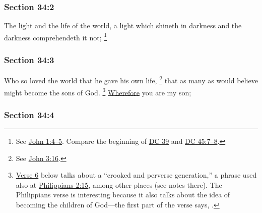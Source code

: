 	\subsubsection{Section 34:2} %
		\label{DC34-2}

		The light and the life of the world, a light which shineth in darkness and the darkness comprehendeth it not;%
			\footnote{%
				See \hyperref[JOHN-1-4]{John 1:4--5}. Compare the beginning of \hyperref[DC39]{DC 39} and \hyperref[DC45-7]{DC 45:7--8}.
				}


	\subsubsection{Section 34:3} %
		\label{DC34-3}

		Who so loved the world that he gave his own life,%
			\footnote{%
				See \hyperref[JOHN-3-16]{John 3:16}.
				}
		that as many as would believe might become the sons of God.%
			\footnote{%
				\hyperref[DC34-6]{Verse 6} below talks about a ``crooked and perverse generation,'' a phrase used also at \hyperref[PHILIPPIANS-2-15]{Philippians 2:15}, among other places (see notes there). The Philippians verse is interesting because it also talks about the idea of becoming the children of God---the first part of the verse says, .
				}
		\hyperref[WHEREFORE]{Wherefore} you are my son;


	\subsubsection{Section 34:4} %
		\label{DC34-4}

